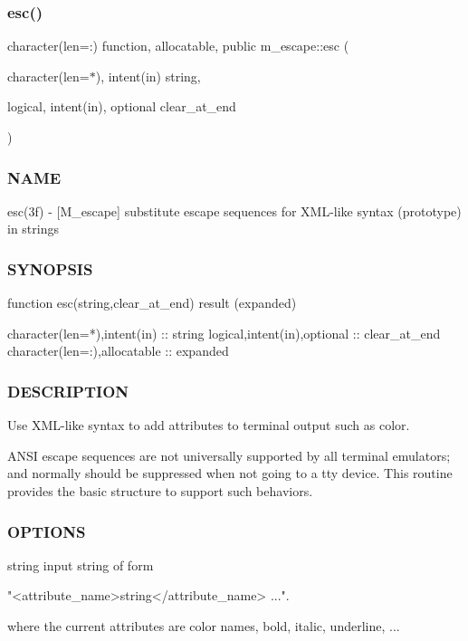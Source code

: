 \subsubsection{\texorpdfstring{esc()}{esc()}}
{\footnotesize\ttfamily character(len=\+:) function, allocatable, public m\+\_\+escape\+::esc (\begin{DoxyParamCaption}\item[{character(len=$\ast$), intent(in)}]{string,  }\item[{logical, intent(in), optional}]{clear\+\_\+at\+\_\+end }\end{DoxyParamCaption})}



\subsubsection*{N\+A\+ME}

esc(3f) -\/ \mbox{[}M\+\_\+escape\mbox{]} substitute escape sequences for X\+M\+L-\/like syntax (prototype) in strings 

\subsubsection*{S\+Y\+N\+O\+P\+S\+IS}

\begin{DoxyVerb} function esc(string,clear_at_end) result (expanded)

   character(len=*),intent(in) :: string
   logical,intent(in),optional :: clear_at_end
   character(len=:),allocatable :: expanded
\end{DoxyVerb}


\subsubsection*{D\+E\+S\+C\+R\+I\+P\+T\+I\+ON}

Use X\+M\+L-\/like syntax to add attributes to terminal output such as color.

A\+N\+SI escape sequences are not universally supported by all terminal emulators; and normally should be suppressed when not going to a tty device. This routine provides the basic structure to support such behaviors.

\subsubsection*{O\+P\+T\+I\+O\+NS}

string input string of form \begin{DoxyVerb}            "<attribute_name>string</attribute_name> ...".

           where the current attributes are color names,
           bold, italic, underline, ...
\end{DoxyVerb}



